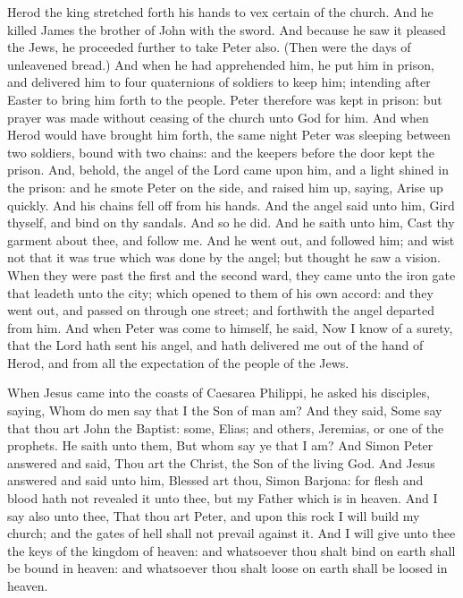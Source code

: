  Herod the king stretched forth his hands to vex certain of the church. And he killed James the brother of John with the sword. And because he saw it pleased the Jews, he proceeded further to take Peter also. (Then were the days of unleavened bread.) And when he had apprehended him, he put him in prison, and delivered him to four quaternions of soldiers to keep him; intending after Easter to bring him forth to the people. Peter therefore was kept in prison: but prayer was made without ceasing of the church unto God for him. And when Herod would have brought him forth, the same night Peter was sleeping between two soldiers, bound with two chains: and the keepers before the door kept the prison. And, behold, the angel of the Lord came upon him, and a light shined in the prison: and he smote Peter on the side, and raised him up, saying, Arise up quickly. And his chains fell off from his hands. And the angel said unto him, Gird thyself, and bind on thy sandals. And so he did. And he saith unto him, Cast thy garment about thee, and follow me. And he went out, and followed him; and wist not that it was true which was done by the angel; but thought he saw a vision. When they were past the first and the second ward, they came unto the iron gate that leadeth unto the city; which opened to them of his own accord: and they went out, and passed on through one street; and forthwith the angel departed from him. And when Peter was come to himself, he said, Now I know of a surety, that the Lord hath sent his angel, and hath delivered me out of the hand of Herod, and from all the expectation of the people of the Jews.

 When Jesus came into the coasts of Caesarea Philippi, he asked his disciples, saying, Whom do men say that I the Son of man am? And they said, Some say that thou art John the Baptist: some, Elias; and others, Jeremias, or one of the prophets. He saith unto them, But whom say ye that I am? And Simon Peter answered and said, Thou art the Christ, the Son of the living God. And Jesus answered and said unto him, Blessed art thou, Simon Barjona: for flesh and blood hath not revealed it unto thee, but my Father which is in heaven. And I say also unto thee, That thou art Peter, and upon this rock I will build my church; and the gates of hell shall not prevail against it. And I will give unto thee the keys of the kingdom of heaven: and whatsoever thou shalt bind on earth shall be bound in heaven: and whatsoever thou shalt loose on earth shall be loosed in heaven.

